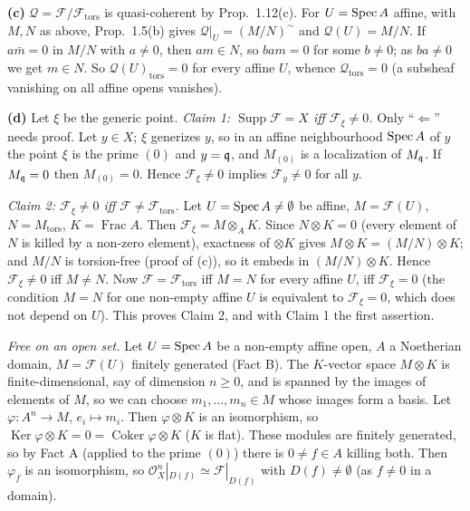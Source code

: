 \documentclass[11pt]{article}
\begin{document}
\textbf{(c)} $\mathcal Q=\mathcal F/\mathcal F_{\operatorname{tors}}$ is quasi-coherent by Prop.~1.12(c). For $U=\operatorname{Spec} A$ affine, with $M,N$ as above, Prop.~1.5(b) gives $\mathcal Q|_U=(M/N)^\sim$ and $\mathcal Q(U)=M/N$. If $a\bar m=0$ in $M/N$ with $a\neq0$, then $am\in N$, so $bam=0$ for some $b\neq0$; as $ba\neq0$ we get $m\in N$. So $\mathcal Q(U)_{\operatorname{tors}}=0$ for every affine $U$, whence $\mathcal Q_{\operatorname{tors}}=0$ (a subsheaf vanishing on all affine opens vanishes).

\textbf{(d)} Let $\xi$ be the generic point. \emph{Claim 1: $\operatorname{Supp}\mathcal F=X$ iff $\mathcal F_\xi\neq0$.} Only ``$\Leftarrow$'' needs proof. Let $y\in X$; $\xi$ generizes $y$, so in an affine neighbourhood $\operatorname{Spec} A$ of $y$ the point $\xi$ is the prime $(0)$ and $y=\mathfrak q$, and $M_{(0)}$ is a localization of $M_\mathfrak q$. If $M_\mathfrak q=0$ then $M_{(0)}=0$. Hence $\mathcal F_\xi\neq0$ implies $\mathcal F_y\ne0$ for all $y$.

\emph{Claim 2: $\mathcal F_\xi\neq0$ iff $\mathcal F\neq\mathcal F_{\operatorname{tors}}$.} Let $U=\operatorname{Spec} A\neq\emptyset$ be affine, $M=\mathcal F(U)$, $N=M_{\operatorname{tors}}$, $K=\operatorname{Frac}A$. Then $\mathcal F_\xi=M\otimes_AK$. Since $N\otimes K=0$ (every element of $N$ is killed by a non-zero element), exactness of $\otimes K$ gives $M\otimes K=(M/N)\otimes K$; and $M/N$ is torsion-free (proof of (c)), so it embeds in $(M/N)\otimes K$. Hence $\mathcal F_\xi\neq0$ iff $M\neq N$. Now $\mathcal F=\mathcal F_{\operatorname{tors}}$ iff $M=N$ for every affine $U$, iff $\mathcal F_\xi=0$ (the condition $M=N$ for one non-empty affine $U$ is equivalent to $\mathcal F_\xi=0$, which does not depend on $U$). This proves Claim 2, and with Claim 1 the first assertion.

\emph{Free on an open set.} Let $U=\operatorname{Spec} A$ be a non-empty affine open, $A$ a Noetherian domain, $M=\mathcal F(U)$ finitely generated (Fact B). The $K$-vector space $M\otimes K$ is finite-dimensional, say of dimension $n\ge0$, and is spanned by the images of elements of $M$, so we can choose $m_1,\dots,m_n\in M$ whose images form a basis. Let $\varphi:A^n\to M$, $e_i\mapsto m_i$. Then $\varphi\otimes K$ is an isomorphism, so $\operatorname{Ker}\varphi\otimes K=0=\operatorname{Coker}\varphi\otimes K$ ($K$ is flat). These modules are finitely generated, so by Fact A (applied to the prime $(0)$) there is $0\neq f\in A$ killing both. Then $\varphi_f$ is an isomorphism, so $\mathcal O_X^n|_{D(f)}\simeq\mathcal F|_{D(f)}$ with $D(f)\neq\emptyset$ (as $f\neq0$ in a domain).
\end{document}
